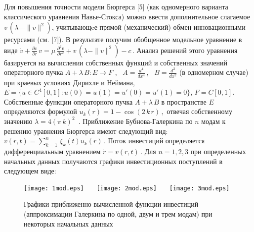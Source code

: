 Для повышения точности модели Бюргерса [5] (как одномерного варианта
классического уравнения Навье-Сток\-са) можно ввести дополнительное
слагаемое $v\,\left(\lambda\, - \|v\|^2\right)$, учитывающeе прямой
(механический) обмен инновационными ресурсами (см. [7]). В
результате получим обобщенное модельное уравнение в виде
 $
\dot{v} + \frac{\partial v}{\partial r}\,v = \mu \, \frac{\partial^2
v}{\partial r^2} + v\,\left(\lambda - \|v\|^2\right) - c \,.
 $
Анализ решений этого уравнения  базируется на вычислении собственных
функций и собственных значений операторного пучка  $A + \lambda\,B :
E \to F$ , \ $A = \frac{d^4}{dx^4}$\,, \ $B = \frac{d^2}{dx^2}$ (в
одномерном случае) при краевых условиях Дирихле и Неймана,\  $E = \{u
\in C^4 [0,1]: u(0)=u(1)=u'(0)=u'(1) = 0 \}$, $ F = C[0,1]$.
Собственные функции операторного пучка $A +\lambda\,B$ в
пространстве $E$ определяются формулой
 $
u_k(r)=1-\cos(2\,k\,r)\,,
 $
отвечая собственному значению $\lambda=4(\pi\,k)^2\,$ . Приближение
Бубнова-Галеркина по $n$ модам к решению уравнения Бюргерса имеют
следующий вид:
 $
v(r,t) = \sum\limits_{k=1}^n\,\xi_k(t)u_k(r)\,.
 $
Поток инвестиций определяется дифференциальным уравнением
 $
\dot r=v(r,t)\,.
 $
Для $n=1,2,3$ при определенных начальных данных получаются графики
инвестиционных поступлений в следующем виде:

\begin{figure}[h!t]
	\centering
	\texttt{[image: 1mod.eps]} \ \ \
	\texttt{[image: 2mod.eps]} \ \ \
	\texttt{[image: 3mod.eps]}
	\caption{
		Графики приближенно вычисленной функции
		инвестиций (аппроксимации Галеркина по одной, двум и трем модам) при
		некоторых начальных данных
	}
\end{figure}



